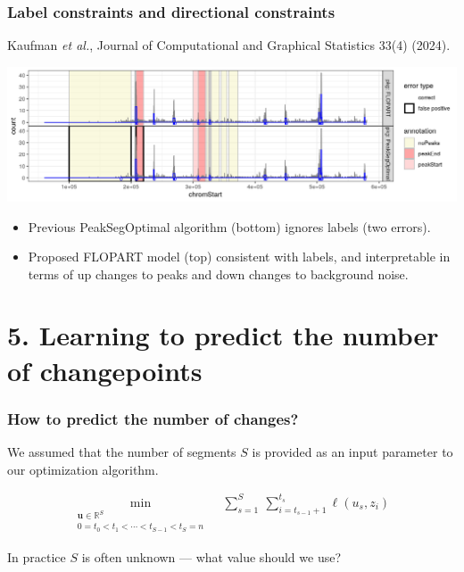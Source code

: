 \documentclass{beamer}
\newcommand{\RR}{\mathbb R}
\begin{document}
\begin{frame}
  \frametitle{Label constraints and directional constraints}
   Kaufman \emph{et al.}, Journal of Computational and Graphical Statistics 33(4) (2024).

  \includegraphics[width=\linewidth]{FLOPART-example}

  \begin{itemize}
  \item Previous PeakSegOptimal algorithm (bottom) ignores labels (two
    errors).
  \item Proposed FLOPART model (top) consistent with labels, and
    interpretable in terms of up changes to peaks and down changes to
    background noise.
  \end{itemize}
\end{frame}

\section{5. Learning to predict the number of changepoints} 
 
\begin{frame}
  \frametitle{How to predict the number of changes?}

  We assumed that the number of segments $S$ is provided as an input
  parameter to our optimization algorithm.

\begin{align*}
\min_{\substack{
  \mathbf u\in\RR^{S}
\\
   0=t_0<t_1<\cdots<t_{S-1}<t_S=n
}} & \ \
    \sum_{s=1}^S\  \sum_{i=t_{s-1}+1}^{t_s} \ell( u_s,  z_i) 
  \nonumber
\end{align*}

In practice $S$ is often unknown --- what value should we use?

\end{frame}
\end{document}

